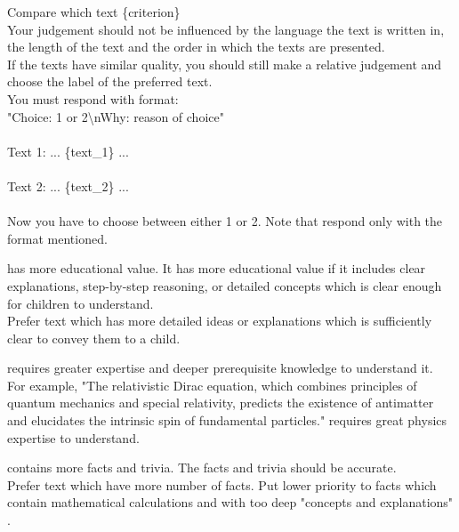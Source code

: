 
\begin{tcolorbox}[title = {Prompt Template},breakable]
\small
Compare which text \{criterion\} \\
Your judgement should not be influenced by the language the text is written in, the length of the text and the order in which the texts are presented. \\
If the texts have similar quality, you should still make a relative judgement and choose the label of the preferred text.  \\
You must respond with format: \\
"Choice: 1 or 2\textbackslash{n}Why: reason of choice"  \\ \\
Text 1:
... \{text\_1\} ...\\ \\
Text 2:
... \{text\_2\} ... \\ \\
Now you have to choose between either 1 or 2. Note that respond only with the format mentioned.
\end{tcolorbox}

\begin{tcolorbox}[title = {Educational Value},breakable]
\small
has more educational value. It has more educational value if it includes clear explanations, step-by-step reasoning, or detailed concepts which is clear enough for children to understand. \\
Prefer text which has more detailed ideas or explanations which is sufficiently clear to convey them to a child.
\end{tcolorbox}

\begin{tcolorbox}[title = {Expertise},breakable]
\small
requires greater expertise and deeper prerequisite knowledge to understand it. \\
For example, "The relativistic Dirac equation, which combines principles of quantum mechanics and special relativity, predicts the existence of antimatter and elucidates the intrinsic spin of fundamental particles." requires great physics expertise to understand.
\end{tcolorbox}

\begin{tcolorbox}[title = {Fact and Trivia},breakable]
\small
contains more facts and trivia. The facts and trivia should be accurate. \\
Prefer text which have more number of facts. Put lower priority to facts which contain mathematical calculations and with too deep "concepts and explanations" .
\end{tcolorbox}

